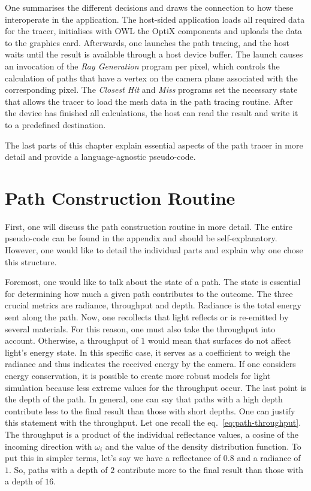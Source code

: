 One summarises the different decisions and draws the connection to how these interoperate in the application.
The host-sided application loads all required data for the tracer, initialises with OWL the OptiX components and uploads the data to the graphics card.
Afterwards, one launches the path tracing, and the host waits until the result is available through a host device buffer.
The launch causes an invocation of the \textit{Ray Generation} program per pixel, which controls the calculation of paths that have a vertex on the camera plane associated with the corresponding pixel.
The \textit{Closest Hit} and \textit{Miss} programs set the necessary state that allows the tracer to load the mesh data in the path tracing routine.
After the device has finished all calculations, the host can read the result and write it to a predefined destination. 

The last parts of this chapter explain essential aspects of the path tracer in more detail and provide a language-agnostic pseudo-code.

\section{Path Construction Routine}

First, one will discuss the path construction routine in more detail.
The entire pseudo-code can be found in the appendix and should be self-explanatory.
However, one would like to detail the individual parts and explain why one chose this structure.

Foremost, one would like to talk about the state of a path.
The state is essential for determining how much a given path contributes to the outcome.
The three crucial metrics are radiance, throughput and depth.
Radiance is the total energy sent along the path.
Now, one recollects that light reflects or is re-emitted by several materials.
For this reason, one must also take the throughput into account.
Otherwise, a throughput of $1$ would mean that surfaces do not affect light's energy state.
In this specific case, it serves as a coefficient to weigh the radiance and thus indicates the received energy by the camera.
If one considers energy conservation, it is possible to create more robust models for light simulation because less extreme values for the throughput occur.
The last point is the depth of the path.
In general, one can say that paths with a high depth contribute less to the final result than those with short depths.
One can justify this statement with the throughput.
Let one recall the eq.~\ref{eq:path-throughput}. 
The throughput is a product of the individual reflectance values, a cosine of the incoming direction with $\omega_i$ and the value of the density distribution function.
To put this in simpler terms, let's say we have a reflectance of $0.8$ and a radiance of $1$. So, paths with a depth of $2$ contribute more to the final result than those with a depth of $16$.

